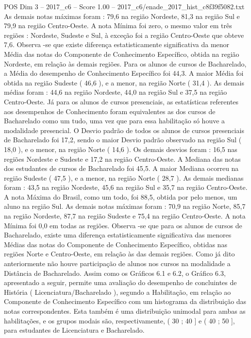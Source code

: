 \begin{textsample}{POS Dim 3 – 2017\_c6 – Score 1.00 – 2017\_c6/enade\_2017\_hist\_c8f39f5082.txt}
As demais notas máximas foram : 79,6 na região Nordeste, 81,3 na região Sul e 79,9 na região Centro-Oeste.
A nota Mínima foi zero, o mesmo valor em três regiões : Nordeste, Sudeste e Sul, à exceção foi a região Centro-Oeste que obteve 7,6.
Observa -se que existe diferença estatisticamente significativa da menor Média das notas do Componente de Conhecimento Específico, obtida na região Nordeste, em relação às demais regiões.
Para os alunos de cursos de Bacharelado, a Média do desempenho de Conhecimento Específico foi 44,3.
A maior Média foi obtida na região Sudeste ( 46,6 ), e a menor, na região Norte ( 31,4 ).
As demais médias foram : 44,6 na região Nordeste, 44,0 na região Sul e 37,5 na região Centro-Oeste.
Já para os alunos de cursos presenciais, as estatísticas referentes aos desempenhos de Conhecimento foram equivalentes as dos cursos de Bacharelado como um tudo, uma vez que para essa habilitação só houve a modalidade presencial.
O Desvio padrão de todos os alunos de cursos presenciais de Bacharelado foi 17,2, sendo o maior Desvio padrão observado na região Sul ( 18,0 ), e o menor, na região Norte ( 14,6 ).
Os demais desvios foram : 16,5 nas regiões Nordeste e Sudeste e 17,2 na região Centro-Oeste.
A Mediana das notas dos estudantes de cursos de Bacharelado foi 45,5.
A maior Mediana ocorreu na região Sudeste ( 47,5 ), e a menor, na região Norte ( 28,7 ).
As demais medianas foram : 43,5 na região Nordeste, 45,6 na região Sul e 35,7 na região Centro-Oeste.
A nota Máxima do Brasil, como um todo, foi 88,5, obtida por pelo menos, um aluno na região Sul.
As demais notas máximas foram : 70,9 na região Norte, 85,7 na região Nordeste, 87,7 na região Sudeste e 75,4 na região Centro-Oeste.
A nota Mínima foi 0,0 em todas as regiões.
Observa -se que para os alunos de cursos de Bacharelado, existe uma diferença estatisticamente significativa das menores Médias das notas do Componente de Conhecimento Específico, obtidas nas regiões Norte e Centro-Oeste, em relação às das demais regiões.
Como já dito anteriormente não houve participação de alunos nos cursos na modalidade a Distância de Bacharelado.
Assim como os Gráficos 6.1 e 6.2, o Gráfico 6.3, apresentado a seguir, permite uma avaliação do desempenho de concluintes de História ( Licenciatura/Bacharelado ), segundo a Habilitação, em relação ao Componente de Conhecimento Específico com um histograma da distribuição das notas correspondentes.
Esta também é uma distribuição unimodal para ambas as habilitações, e os grupos modais são, respectivamente, ( 30 ; 40 ] e ( 40 ; 50 ], para estudantes de Licenciatura e Bacharelado.

\end{textsample}
